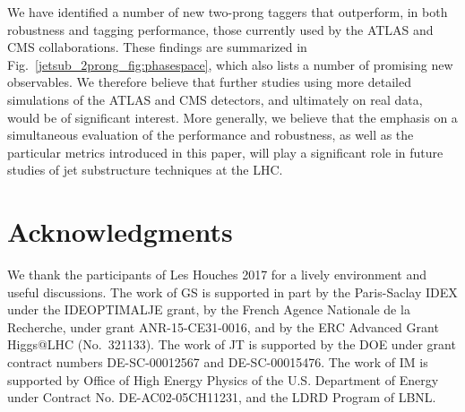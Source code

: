 \documentclass[11pt]{cernrep}
\begin{document}
We have identified a  number of new two-prong taggers that outperform, in both robustness and tagging performance, those currently used by the ATLAS and CMS collaborations.
%
These findings are summarized in Fig.~\ref{jetsub_2prong_fig:phasespace}, which also lists a number of promising new observables.
%
We therefore believe that further studies using more detailed simulations of the ATLAS and CMS detectors, and ultimately on real data, would be of significant interest.
%
More generally, we believe that the emphasis on a simultaneous evaluation of the performance and robustness, as well as the particular metrics introduced in this paper, will play a significant role in future studies of jet substructure techniques at the LHC.

\section{Acknowledgments}

We thank the participants of Les Houches 2017 for a lively environment and useful discussions. The work of GS is supported in part by the Paris-Saclay IDEX under the
IDEOPTIMALJE grant, by the French Agence Nationale de la Recherche,
under grant ANR-15-CE31-0016, and by the ERC Advanced Grant Higgs@LHC
(No.\ 321133).
%
The work of JT is supported by the DOE under grant contract numbers DE-SC-00012567 and DE-SC-00015476.
%
The work of IM is supported by Office of High Energy Physics of the U.S. Department of Energy under Contract No. DE-AC02-05CH11231, and the LDRD Program of LBNL.






\end{document}
